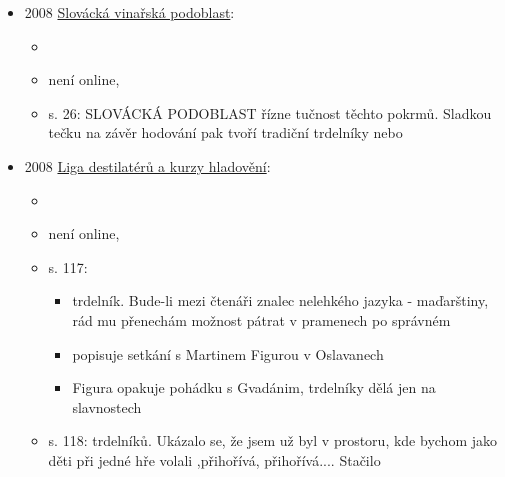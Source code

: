 \begin{itemize}
  \begin{itemize}
  \tightlist
  \item
    bakalářská práce
  \item
    s. 15:

    \begin{itemize}
    \tightlist
    \item
      v září roku 1946 uspořádala skupina s neoficiálním názvem Valašský
      krúžek výstavu v Klubu „Z``.
    \item
      v druhé místnosti se nacházela stará valašská kuchyň s pecí, kde
      se po celou dobu výstavy pekly trdelníky a hrála zde cimbálová
      muzika z Valašského Meziříčí.
    \end{itemize}
  \end{itemize}
\item
  2008
  \href{https://www.digitalniknihovna.cz/mzk/uuid/uuid:bb345720-fedb-11e4-88cd-005056827e52}{Slovácká
  vinařská podoblast}:

  \begin{itemize}
  \tightlist
  \item
  \item
    není online, 
  \item
    s. 26: SLOVÁCKÁ PODOBLAST řízne tučnost těchto pokrmů. Sladkou tečku
    na závěr hodování pak tvoří tradiční trdelníky nebo
  \end{itemize}
\item
  2008
  \href{https://www.digitalniknihovna.cz/mzk/uuid/uuid:ebab4f30-c5fc-11e3-b110-005056827e51}{Liga
  destilatérů a kurzy hladovění}:

  \begin{itemize}
  \tightlist
  \item
  \item
    není online,
  \item
    s. 117:

    \begin{itemize}
    \tightlist
    \item
      trdelník. Bude-li mezi čtenáři znalec nelehkého jazyka -
      maďarštiny, rád mu přenechám možnost pátrat v pramenech po
      správném
    \item
      popisuje setkání s Martinem Figurou v Oslavanech
    \item
      Figura opakuje pohádku s Gvadánim, trdelníky dělá jen na
      slavnostech
    \end{itemize}
  \item
    s. 118: trdelníků. Ukázalo se, že jsem už byl v prostoru, kde bychom
    jako děti při jedné hře volali ,přihořívá,
    přihořívá...\textquotesingle. Stačilo


\end{itemize}
\end{itemize}

